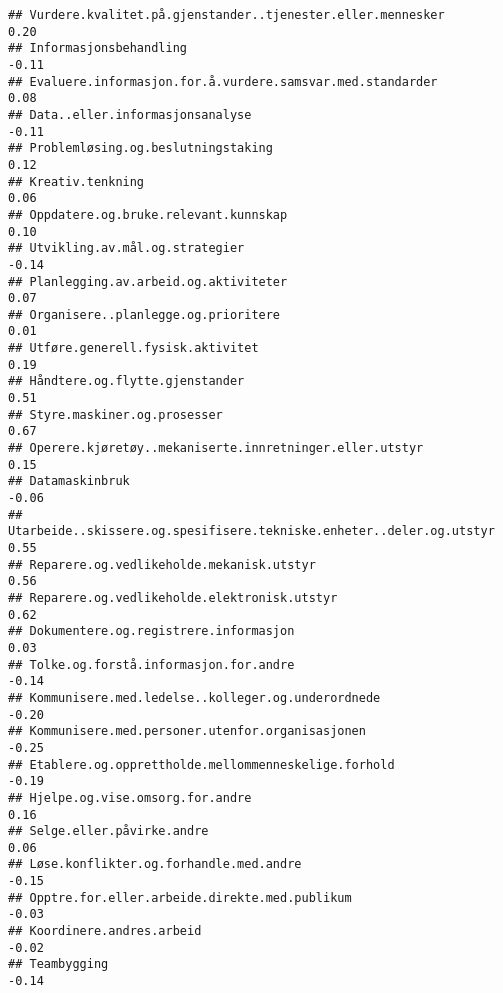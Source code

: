 \documentclass[
]{article}
\begin{document}
\begin{verbatim}
## Vurdere.kvalitet.på.gjenstander..tjenester.eller.mennesker                        0.20
## Informasjonsbehandling                                                           -0.11
## Evaluere.informasjon.for.å.vurdere.samsvar.med.standarder                         0.08
## Data..eller.informasjonsanalyse                                                  -0.11
## Problemløsing.og.beslutningstaking                                                0.12
## Kreativ.tenkning                                                                  0.06
## Oppdatere.og.bruke.relevant.kunnskap                                              0.10
## Utvikling.av.mål.og.strategier                                                   -0.14
## Planlegging.av.arbeid.og.aktiviteter                                              0.07
## Organisere..planlegge.og.prioritere                                               0.01
## Utføre.generell.fysisk.aktivitet                                                  0.19
## Håndtere.og.flytte.gjenstander                                                    0.51
## Styre.maskiner.og.prosesser                                                       0.67
## Operere.kjøretøy..mekaniserte.innretninger.eller.utstyr                           0.15
## Datamaskinbruk                                                                   -0.06
## Utarbeide..skissere.og.spesifisere.tekniske.enheter..deler.og.utstyr              0.55
## Reparere.og.vedlikeholde.mekanisk.utstyr                                          0.56
## Reparere.og.vedlikeholde.elektronisk.utstyr                                       0.62
## Dokumentere.og.registrere.informasjon                                             0.03
## Tolke.og.forstå.informasjon.for.andre                                            -0.14
## Kommunisere.med.ledelse..kolleger.og.underordnede                                -0.20
## Kommunisere.med.personer.utenfor.organisasjonen                                  -0.25
## Etablere.og.opprettholde.mellommenneskelige.forhold                              -0.19
## Hjelpe.og.vise.omsorg.for.andre                                                   0.16
## Selge.eller.påvirke.andre                                                         0.06
## Løse.konflikter.og.forhandle.med.andre                                           -0.15
## Opptre.for.eller.arbeide.direkte.med.publikum                                    -0.03
## Koordinere.andres.arbeid                                                         -0.02
## Teambygging                                                                      -0.14

\end{verbatim}
\end{document}
